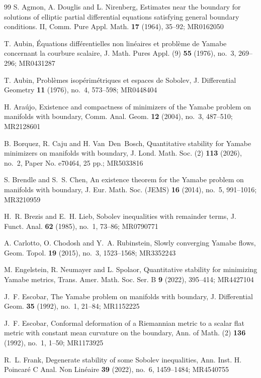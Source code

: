 \documentclass[12pt]{amsart}
\begin{document}
\begin{thebibliography}{99}
     S. Agmon, A. Douglis and L. Nirenberg, Estimates near the boundary for solutions of elliptic partial differential equations satisfying general boundary conditions. II, Comm. Pure Appl. Math. {\bf 17} (1964), 35--92; MR0162050
    
     T. Aubin, \'Equations diff\'erentielles non lin\'eaires et probl\`eme de Yamabe concernant la courbure scalaire, J. Math. Pures Appl. (9) {\bf 55} (1976), no.~3, 269--296; MR0431287

     T. Aubin, Probl\`emes isop\'erim\'etriques et espaces de Sobolev, J. Differential Geometry {\bf 11} (1976), no.~4, 573--598; MR0448404

     H. Ara\'ujo, Existence and compactness of minimizers of the Yamabe problem on manifolds with boundary, Comm. Anal. Geom. {\bf 12} (2004), no.~3, 487--510; MR2128601

     B. Borquez, R. Caju and H. Van~Den~Bosch, Quantitative stability for Yamabe minimizers on manifolds with boundary, J. Lond. Math. Soc. (2) {\bf 113} (2026), no.~2, Paper No. e70464, 25 pp.; MR5033816

     S. Brendle and S.~S. Chen, An existence theorem for the Yamabe problem on manifolds with boundary, J. Eur. Math. Soc. (JEMS) {\bf 16} (2014), no.~5, 991--1016; MR3210959

     H.~R. Brezis and E.~H. Lieb, Sobolev inequalities with remainder terms, J. Funct. Anal. {\bf 62} (1985), no.~1, 73--86; MR0790771

     A. Carlotto, O. Chodosh and Y.~A. Rubinstein, Slowly converging Yamabe flows, Geom. Topol. {\bf 19} (2015), no.~3, 1523--1568; MR3352243

     M. Engelstein, R. Neumayer and L. Spolaor, Quantitative stability for minimizing Yamabe metrics, Trans. Amer. Math. Soc. Ser. B {\bf 9} (2022), 395--414; MR4427104

     J.~F. Escobar, The Yamabe problem on manifolds with boundary, J. Differential Geom. {\bf 35} (1992), no.~1, 21--84; MR1152225

     J.~F. Escobar, Conformal deformation of a Riemannian metric to a scalar flat metric with constant mean curvature on the boundary, Ann. of Math. (2) {\bf 136} (1992), no.~1, 1--50; MR1173925

     R.~L. Frank, Degenerate stability of some Sobolev inequalities, Ann. Inst. H. Poincar\'e{} C Anal. Non Lin\'eaire {\bf 39} (2022), no.~6, 1459--1484; MR4540755


\end{thebibliography}
\end{document}
